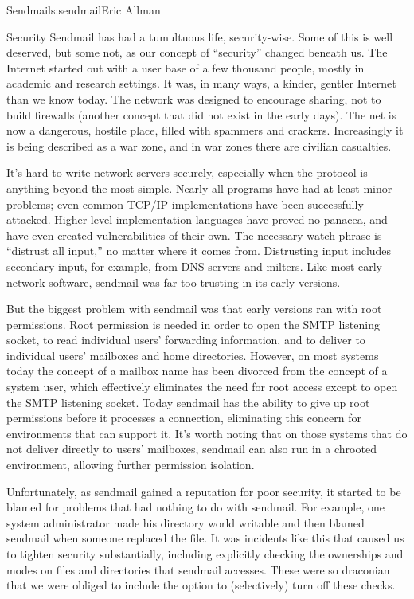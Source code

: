 \begin{aosachapter}{Sendmail}{s:sendmail}{Eric Allman}
\begin{aosasect1}{Security}
Sendmail has had a tumultuous life, security-wise. Some of this is
well deserved, but some not, as our concept of ``security'' changed
beneath us. The Internet started out with a user base of a few
thousand people, mostly in academic and research settings. It was, in
many ways, a kinder, gentler Internet than we know today. The network
was designed to encourage sharing, not to build firewalls (another
concept that did not exist in the early days). The net is now a
dangerous, hostile place, filled with spammers and crackers.
Increasingly it is being described as a war zone, and in war zones
there are civilian casualties.

It's hard to write network servers securely, especially when the
protocol is anything beyond the most simple. Nearly all programs have
had at least minor problems; even common TCP/IP implementations have
been successfully attacked. Higher-level implementation languages have
proved no panacea, and have even created vulnerabilities of their
own. The necessary watch phrase is ``distrust all input,'' no matter
where it comes from. Distrusting input includes secondary input, for
example, from DNS servers and milters. Like most early network
software, sendmail was far too trusting in its early versions.

But the biggest problem with sendmail was that early versions ran with
root permissions. Root permission is needed in order to open the SMTP
listening socket, to read individual users' forwarding information,
and to deliver to individual users' mailboxes and home
directories. However, on most systems today the concept of a mailbox
name has been divorced from the concept of a system user, which
effectively eliminates the need for root access except to open the
SMTP listening socket. Today sendmail has the ability to give up root
permissions before it processes a connection, eliminating this concern
for environments that can support it. It's worth noting that on those
systems that do not deliver directly to users' mailboxes, sendmail can
also run in a chrooted environment, allowing further permission
isolation.

Unfortunately, as sendmail gained a reputation for poor security, it
started to be blamed for problems that had nothing to do with
sendmail.  For example, one system administrator made his 
directory world writable and then blamed sendmail when someone
replaced the  file. It was incidents like this that
caused us to tighten security substantially, including explicitly
checking the ownerships and modes on files and directories that
sendmail accesses. These were so draconian that we were obliged to
include the  option to (selectively) turn off
these checks.


\end{aosasect1}
\end{aosachapter}

